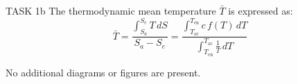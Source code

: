TASK 1b  
The thermodynamic mean temperature \( \bar{T} \) is expressed as:  
\[
\bar{T} = \frac{\int_{S_a}^{S_e} T \, dS}{S_a - S_e} = \frac{\int_{T_{\text{ac}}}^{T_{\text{en}}} c \, f(T) \, dT}{\int_{T_{\text{en}}}^{T_{\text{ac}}} \frac{1}{T} \, dT}
\]  

No additional diagrams or figures are present.